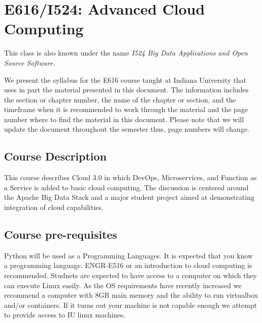 

\chapter{E616/I524: Advanced Cloud Computing}

This class is also known under the name {\em I524 Big Data
Applications and Open Source Software.}
 

We present the syllabus for the E616 course taught at Indiana
University that uses in part the material presented in this
document. The information includes the section or chapter number, the
name of the chapter or section, and the timeframe when it is
recommended to work through the material and the page number where to
find the material in this document. Please note that we will update
the document throughout the semester thus, page numbers will change.

\section{Course Description }

This course describes Cloud 3.0 in which DevOps, Microservices, and
Function as a Service is added to basic cloud computing. The
discussion is centered around the Apache Big Data Stack and a major
student project aimed at demonstrating integration of cloud
capabilities.

\section{Course pre-requisites}

Python will be used as a Programming Languages. It is expected that
you know a programming language. ENGR-E516 or an introduction to cloud
computing is recommended. Studnets are expected to have access to a
computer on which they can execute Linux easily. As the OS
requirements have recently increased we recommend a computer with 8GB
main memory and the ability to run virtualbox and/or containers. If it
turns out your machine is not capable enough we attempt to provide
access to IU linux machines.

